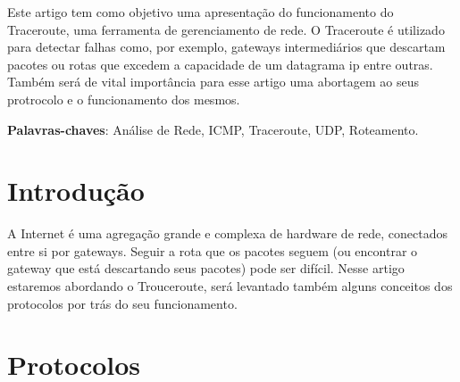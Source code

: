 \documentclass[
	article,			%
	11pt,				%
	oneside,			%
	a4paper,			%
	section=TITLE,		%
	english,			%
	brazil,				%
	sumario=tradicional
	]{abntex2}
\begin{document}
\frenchspacing 


%
%
\maketitle

\begin{resumoumacoluna}
 Este artigo tem como objetivo uma apresentação do funcionamento do Traceroute, uma ferramenta de gerenciamento de rede. O Traceroute é utilizado para detectar falhas como, por exemplo, gateways intermediários que descartam pacotes ou rotas que excedem a capacidade de um datagrama ip entre outras. Também será de vital importância para esse artigo uma abortagem ao seus protrocolo e o funcionamento dos mesmos.
 
 \vspace{\onelineskip}
 
 \noindent
 \textbf{Palavras-chaves}: Análise de Rede, ICMP, Traceroute, UDP, Roteamento.
\end{resumoumacoluna}


\textual

\section*{Introdução}
A Internet é uma agregação grande e complexa de hardware de rede, conectados entre si por gateways. Seguir a rota que os pacotes seguem (ou encontrar o gateway que está descartando seus pacotes) pode ser difícil. 
Nesse artigo estaremos abordando o Trouceroute, será levantado também alguns conceitos dos protocolos por trás do seu funcionamento.

\section{Protocolos}
\end{document}

